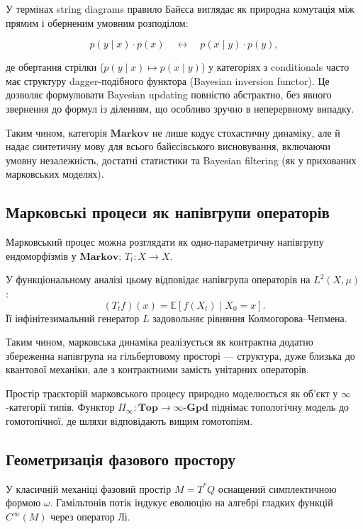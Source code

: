 \documentclass[a4paper,12pt]{article}
\begin{document}
У термінах string diagrams правило Байєса виглядає як природна комутація між прямим і оберненим умовним розподілом:

\[
p(y \mid x) \cdot p(x) \quad \longleftrightarrow \quad p(x \mid y) \cdot p(y),
\]

де обертання стрілки ($p(y \mid x) \mapsto p(x \mid y)$) у категоріях з conditionals часто має структуру dagger-подібного функтора (Bayesian inversion functor). Це дозволяє формулювати Bayesian updating повністю абстрактно, без явного звернення до формул із діленням, що особливо зручно в неперервному випадку.

Таким чином, категорія $\mathbf{Markov}$ не лише кодує стохастичну динаміку, але й надає синтетичну мову для всього байєсівського висновування, включаючи умовну незалежність, достатні статистики та Bayesian filtering (як у прихованих марковських моделях).

\subsection{Марковські процеси як напівгрупи операторів}

Марковський процес можна розглядати як одно-параметричну напівгрупу ендоморфізмів у $\mathbf{Markov}$: $T_t : X \to X$. 

У функціональному аналізі цьому відповідає напівгрупа операторів на $L^2(X,\mu)$:
\[
(T_t f)(x) = \mathbb{E}[f(X_t) \mid X_0 = x].
\]
Її інфінітезимальний генератор $L$ задовольняє рівняння Колмогорова–Чепмена. 

Таким чином, марковська динаміка реалізується як контрактна додатно збереженна напівгрупа на гільбертовому просторі — структура, дуже близька до квантової механіки, але з контрактними замість унітарних операторів.

Простір траєкторій марковського процесу природно моделюється як об’єкт у $\infty$-категорії типів. Функтор $\Pi_\infty : \mathbf{Top} \to \infty\text{-}\mathbf{Gpd}$ піднімає топологічну модель до гомотопічної, де шляхи відповідають вищим гомотопіям.

\subsection{Геометризація фазового простору}

У класичній механіці фазовий простір $M = T^*Q$ оснащений симплектичною формою $\omega$. Гамільтонів потік індукує еволюцію на алгебрі гладких функцій $C^\infty(M)$ через оператор Лі. 
\end{document}
